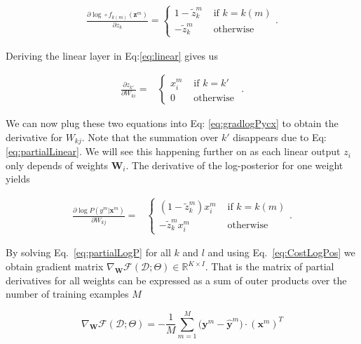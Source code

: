 \begin{align}
\frac{\partial \log \circ f_{k(m)}(\mathbf{z}^m)}{\partial z_{k}} = 
  \begin{cases}
      1 - \tilde{z}_k^m  &  \mbox{ if } k = k(m)\\ 
      -\tilde{z}_k^m    &  \mbox{ otherwise } 
  \end{cases}. 
  \label{eq:patialSoftmax}
\end{align}

\noindent Deriving the linear layer in Eq:\ref{eq:linear} gives us

\begin{align}
\frac{\partial z_{k'}}{\partial W_{ki}} = 
  &\begin{cases}
      x_i^m  &  \mbox{ if } k = k'\\ 
      0    &  \mbox{ otherwise } 
  \end{cases}.
  \label{eq:partialLinear}
\end{align}

We can now plug these two equations into Eq: \ref{eq:gradlogPycx} to obtain the
derivative for $W_{kj}$. Note that the summation over $k'$ disappears due to
Eq:\ref{eq:partialLinear}. We will see this happening further on as each linear
output $z_i$ only depends of weights $\mathbf{W}_i$. The derivative of the
log-posterior for one weight yields 

\begin{align}
\frac{\partial \log P(y^m | \mathbf{x}^m) }{\partial W_{kj}} = 
  &\begin{cases}
     (1 - \tilde{z}_k^m) x_i^m  &  \mbox{ if } k = k(m)\\ 
       -\tilde{z}_k^m x_i^m             &  \mbox{ otherwise } 
  \end{cases}. 
  \label{eq:partialLogP} 
\end{align}

By solving Eq.~\ref{eq:partialLogP} for all $k$ and $l$ and using
Eq.~\ref{eq:CostLogPos} we obtain gradient matrix
$\nabla_\mathbf{W}\mathcal{F}(\mathcal{D};\Theta) \in \mathbb{R}^{K \times I}$.
That is the matrix of partial derivatives for all weights can be expressed as a
sum of outer products over the number of training examples $M$  

\begin{equation}
\nabla_\mathbf{W}\mathcal{F}(\mathcal{D};\Theta) = -\frac{1}{M}\sum_{m=1}^M \Big(\mathbf{y}^m - \hat{\mathbf{y}}^m \Big) \cdot \left(\mathbf{x}^m\right)^T  
\label{gradWeigths}
\end{equation}

